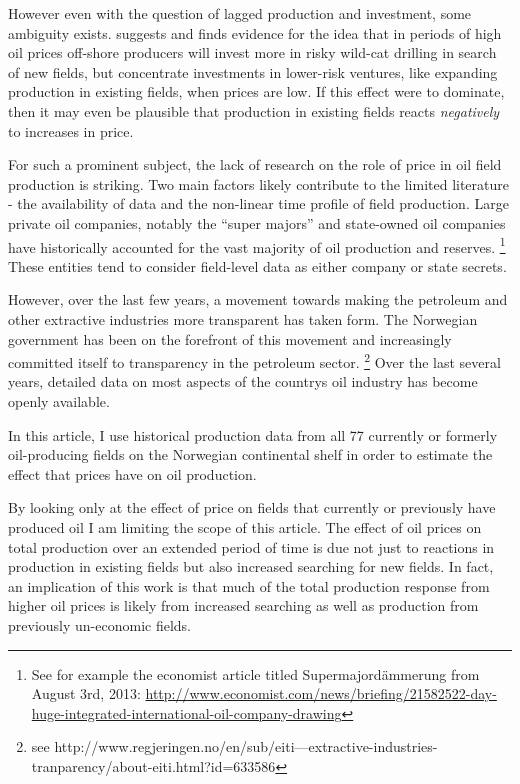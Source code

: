 \documentclass[12pt]{article}
\begin{document}
However even with the question of lagged production and investment, some ambiguity exists.  \citet{mohn_efforts_2008} suggests and finds evidence for the idea that in periods of high oil prices off-shore producers will invest more in risky wild-cat drilling in search of new fields, but concentrate investments in lower-risk ventures, like expanding production in existing fields, when prices are low.  If this effect were to dominate, then it may even be plausible that production in existing fields reacts \emph{negatively} to increases in price. 


For such a prominent subject, the lack of research on the role of price in oil field production is striking. Two main factors likely contribute to the limited literature - the availability of data and the non-linear time profile of field production.  Large private oil companies, notably the “super majors” and state-owned oil companies have historically accounted for the vast majority of oil production and reserves. \footnote{See for example the economist article titled Supermajordämmerung from August 3rd, 2013: \url{http://www.economist.com/news/briefing/21582522-day-huge-integrated-international-oil-company-drawing}} These entities tend to consider field-level data as either company or state secrets.   

However, over the last few years, a movement towards making the petroleum and other extractive industries more transparent has taken form.  The Norwegian government has been on the forefront of this movement and increasingly committed itself to transparency in the petroleum sector. \footnote{see http://www.regjeringen.no/en/sub/eiti---extractive-industries-tranparency/about-eiti.html?id=633586} Over the last several years, detailed data on most aspects of the country\’s oil industry has become openly available.  

In this article, I use historical production data from all 77 currently or formerly oil-producing fields on the Norwegian continental shelf in order to estimate the effect that prices have on oil production.  

By looking only at the effect of price on fields that currently or previously have produced oil I am limiting the scope of this article.  The effect of oil prices on total production over an extended period of time is due not just to reactions in production in existing fields but also increased searching for new fields.  In fact, an implication of this work is that much of the total production response from higher oil prices is likely from increased searching as well as production from previously un-economic fields.
\end{document}
